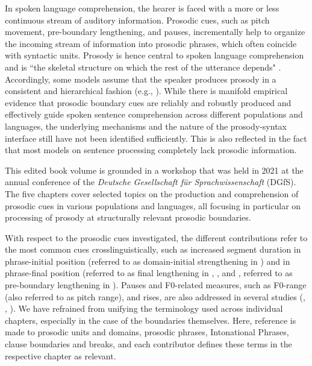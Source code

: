 \begin{refsection}
In spoken language comprehension, the hearer is faced with a more or less continuous stream of auditory information. Prosodic cues, such as pitch movement, pre-boundary lengthening, and pauses, incrementally help to organize the incoming stream of information into prosodic phrases, which often coincide with syntactic units. Prosody is hence central to spoken language comprehension and is ``the skeletal structure on which the rest of the utterance depends" \citep[248]{frazier_prosodic_2006}. Accordingly, some models assume that the speaker produces prosody in a consistent and hierarchical fashion (e.g., \cite{nespor_prosodic_1986}). While there is manifold empirical evidence that prosodic boundary cues are reliably and robustly produced and effectively guide spoken sentence comprehension across different populations and languages, the underlying mechanisms and the nature of the prosody-syntax interface still have not been identified sufficiently. This is also reflected in the fact that most models on sentence processing completely lack prosodic information. 

This edited book volume is grounded in a workshop that was held in 2021 at the annual conference of the \textit{Deutsche Gesellschaft für Sprachwissenschaft} (DGfS). The five chapters cover selected topics on the production and comprehension of prosodic cues in various populations and languages, all focusing in particular on processing of prosody at structurally relevant prosodic boundaries.

With respect to the prosodic cues investigated, the different contributions refer to the most common cues crosslinguistically, such as increased segment duration in phrase-initial position (referred to as domain-initial strengthening in ) and in phrase-final position (referred to as final lengthening in , , and , referred to as pre-boundary lengthening in ). Pauses and F0-related measures, such as F0-range (also referred to as pitch range), and rises, are also addressed in several studies (, , ). We have refrained from unifying the terminology used across individual chapters, especially in the case of the boundaries themselves. Here, reference is made to prosodic units and domains, prosodic phrases, Intonational Phrases, clause boundaries and breaks, and each contributor defines these terms in the respective chapter as relevant.


\end{refsection}
